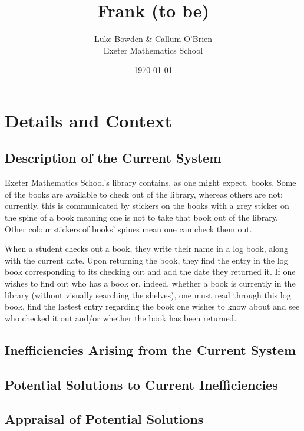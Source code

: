 \documentclass[draft]{book}
\begin{document}
\frontmatter

\title{Frank (to be)}
\author{Luke Bowden \& Callum O'Brien\\
    Exeter Mathematics School}
\date{\today}
\maketitle

\tableofcontents

\mainmatter

\chapter{Details and Context}

\section{Description of the Current System}

Exeter Mathematics School's library contains, as one might expect, books. Some of the books are available to check out of the library, whereas others are not; currently, this is communicated by stickers on the books with a grey sticker on the spine of a book meaning one is not to take that book out of the library. Other colour stickers of books' spines mean one can check them out.

When a student checks out a book, they write their name in a log book, along with the current date. Upon returning the book, they find the entry in the log book corresponding to its checking out and add the date they returned it. If one wishes to find out who has a book or, indeed, whether a book is currently in the library (without visually searching the shelves), one must read through this log book, find the lastest entry regarding the book one wishes to know about and see who checked it out and/or whether the book has been returned.

\section{Inefficiencies Arising from the Current System}

\section{Potential Solutions to Current Inefficiencies}

\section{Appraisal of Potential Solutions}
\end{document}
